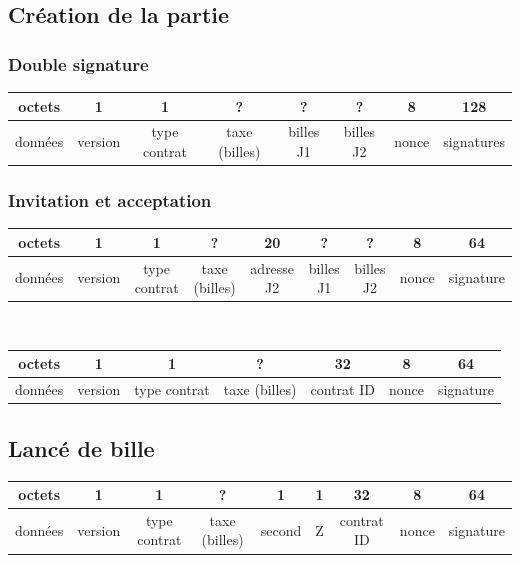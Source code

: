 \documentclass{article}
\begin{document}
\subsection{Création de la partie}
\subsubsection{Double signature}
\hspace*{-1cm}%
\begin{tabular}{ |c|c|c|c|c|c|c|c|} 
 \hline
 octets & 1 & 1 & ? & ? & ? & 8 & 128\\ 
 \hline
    données & version & type contrat & taxe (billes) & billes J1 & billes J2 & nonce & signatures\\ 
 \hline
\end{tabular}

\subsubsection{Invitation et acceptation}
\hspace*{-1cm}%
\begin{tabular}{ |c|c|c|c|c|c|c|c|c|} 
 \hline
 octets & 1 & 1 & ? & 20 & ? & ? & 8 & 64\\ 
 \hline
    données & version & type contrat & taxe (billes) & adresse J2 & billes J1 & billes J2 & nonce & signature\\ 
 \hline
\end{tabular}\\ \break

\hspace*{-1cm}%
\begin{tabular}{ |c|c|c|c|c|c|c|} 
 \hline
 octets & 1 & 1 & ? & 32 & 8 & 64\\ 
 \hline
    données & version & type contrat & taxe (billes) & contrat ID & nonce & signature\\ 
 \hline
\end{tabular}

\subsection{Lancé de bille}
\hspace*{-1cm}%
\begin{tabular}{ |c|c|c|c|c|c|c|c|c|} 
 \hline
 octets & 1 & 1 & ? & 1 & 1 & 32 & 8 & 64 \\ 
 \hline
    données & version & type contrat & taxe (billes) & second & Z & contrat ID & nonce & signature\\ 
 \hline
\end{tabular}
\end{document}
